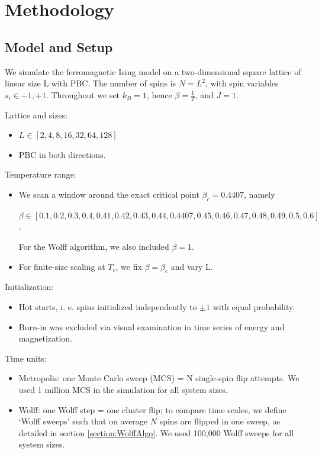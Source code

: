 \section{Methodology}


\subsection{Model and Setup}
We simulate the ferromagnetic Ising model on a two-dimensional square lattice of linear size L with PBC. The number of spins is $N = L^2$, with spin variables $s_i \in {-1, +1}$. Throughout we set $k_B = 1$, hence $\beta = \frac{1}{T}$, and $J = 1$.

Lattice and sizes:
\begin{itemize}
    \item $L \in [2, 4, 8, 16, 32, 64, 128]$
    \item PBC in both directions.
\end{itemize}

Temperature range:
\begin{itemize}
    \item We scan a window around the exact critical point $\beta_c = 0.4407$, namely
    
    \begin{center}
        $\beta \in [0.1, 0.2, 0.3, 0.4, 0.41, 0.42, 0.43, 0.44, 0.4407, 0.45, 0.46, 0.47, 0.48, 0.49, 0.5, 0.6]$.
    \end{center}

    For the Wolff algorithm, we also included $\beta = 1$.

    \item For finite-size scaling at $T_c$, we fix $\beta = \beta_c$ and vary L.
\end{itemize}

Initialization:
\begin{itemize}
    \item Hot starts, i. e. spins initialized independently to $\pm 1$ with equal probability.
    \item Burn-in was excluded via visual examination in time series of energy and magnetization.
\end{itemize}

Time units:
\begin{itemize}
    \item Metropolis: one Monte Carlo sweep (MCS) = N single-spin flip attempts. We used 1 million MCS in the simulation for all system sizes.
    \item Wolff: one Wolff step = one cluster flip; to compare time scales, we define `Wolff sweeps' such that on average $N$ spins are flipped in one sweep, as detailed in section \ref{section:WolffAlgo}. We used 100,000 Wolff sweeps for all system sizes.
\end{itemize}

